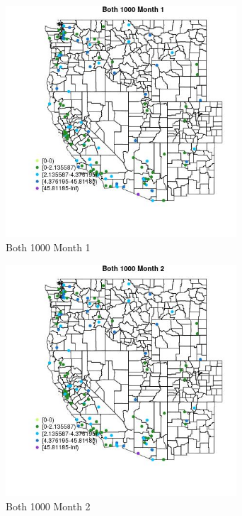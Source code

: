 \begin{figure} 
\centering  
\includegraphics[width=0.77\textwidth]{Code_Outputs/Report_ML_input_PM25_Step4_part_e_de_duplicated_aves_MapObsMo1Both_1000.jpg} 
\caption{\label{fig:Report_ML_input_PM25_Step4_part_e_de_duplicated_avesMapObsMo1Both_1000}Both 1000 Month 1} 
\end{figure} 
 

\begin{figure} 
\centering  
\includegraphics[width=0.77\textwidth]{Code_Outputs/Report_ML_input_PM25_Step4_part_e_de_duplicated_aves_MapObsMo2Both_1000.jpg} 
\caption{\label{fig:Report_ML_input_PM25_Step4_part_e_de_duplicated_avesMapObsMo2Both_1000}Both 1000 Month 2} 
\end{figure} 
 

